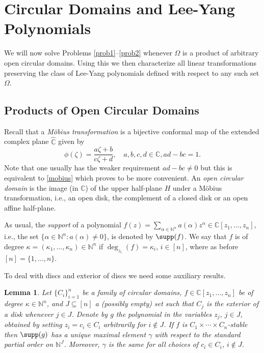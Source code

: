 \documentclass[10pt,reqno]{amsart}
\theoremstyle{plain}
\newtheorem{lemma}[theorem]{Lemma}
\theoremstyle{definition}
\theoremstyle{remark}
\numberwithin{equation}{section}
\newcommand{\NN}{\mathbb{N}}
\newcommand{\CC}{\mathbb{C}}
\begin{document}

\section{Circular Domains and Lee-Yang Polynomials}\label{s-CDLY}

We will now solve Problems \ref{prob1}--\ref{prob2} whenever $\Omega$ is a 
product of arbitrary open circular domains. Using this 
we then characterize all linear transformations preserving the class of 
Lee-Yang polynomials defined with respect to any such set $\Omega$.

\subsection{Products of Open Circular Domains}\label{OCCD}

Recall that a {\em M\"obius transformation} is a bijective 
conformal map of the extended complex plane $\widehat{\CC}$ given by 
\begin{equation}\label{mobius}
\phi(\zeta)= \frac {a\zeta+b}{c\zeta+d}, \quad a,b,c,d \in \CC, ad-bc =1. 
\end{equation}
Note that one usually has the weaker requirement $ad-bc \neq 0$ but 
this is equivalent to \eqref{mobius} which proves to be 
more convenient.
An {\em open circular domain} is the 
image (in $\CC$) of the upper half-plane $H$ under a 
M\"obius transformation, i.e., an open disk, the complement of a closed disk 
or an open affine half-plane. 

As usual, the {\em support}  of a polynomial 
$f(z)=\sum_{\alpha \in \NN^n} a(\alpha) z^\alpha \in \CC[z_1,\ldots, z_n]$, 
i.e., the set $\{\alpha \in \NN^n : a(\alpha) \neq 0\}$, is 
denoted by $\supp(f)$. 
We say that $f$ is of degree $\kappa=(\kappa_1,\ldots,\kappa_n) \in \NN^n$ if 
$\deg_{z_i}(f)=\kappa_i$, $i\in [n]$, where as before $[n]=\{1,\ldots,n\}$. 

To deal with discs and exterior of discs we need some auxiliary results.

\begin{lemma}\label{maxsupport}
Let $\{C_i\}_{i=1}^n$ be a family of circular domains, 
$f \in \CC[z_1,\ldots, z_n]$ be of degree $\kappa\in\NN^n$, and 
$J \subseteq [n]$ a (possibly empty) set such that $C_j$ is the exterior of 
a disk whenever $j \in J$. Denote by $g$ 
the polynomial in the variables $z_j$, $j \in J$, obtained by setting 
$z_i = c_i \in C_i$ arbitrarily for $i \notin J$. If $f$ is 
$C_1\times\cdots\times C_n$-stable then 
$\supp(g)$ has a unique maximal element $\gamma$ with respect to the 
standard partial order on $\NN^J$. Moreover, 
$\gamma$ is the same for all choices of $c_i \in C_i$, $i \notin J$. 
\end{lemma}
\end{document}
